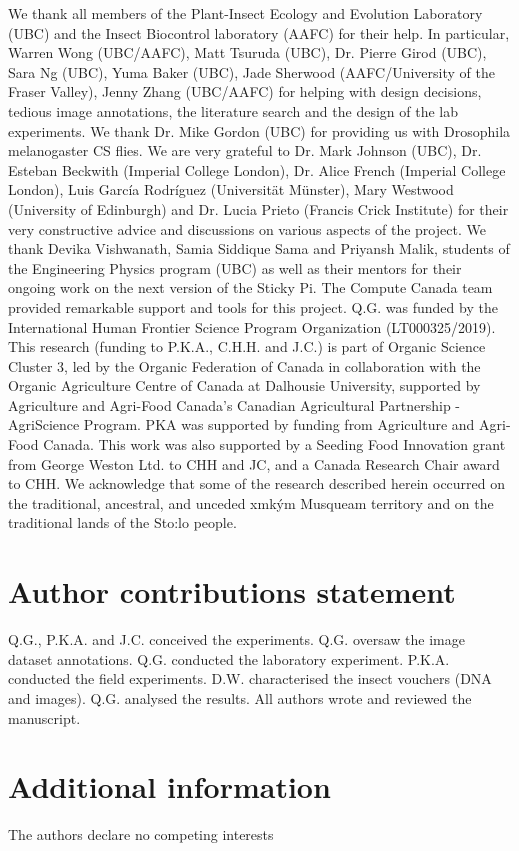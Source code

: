 \documentclass[12pt]{article}
\newcommand{\musqueam}{x\super{w}m\textschwa{}\texttheta{}k\super{w}\textschwa{}\'{y}\textschwa{}m}
\begin{document}
\begin{linenumbers}
{			We thank all members of the Plant-Insect Ecology and Evolution Laboratory (UBC) and the Insect Biocontrol laboratory (AAFC) for their help. In particular, Warren Wong (UBC/AAFC), Matt Tsuruda (UBC), Dr. Pierre Girod (UBC), Sara Ng (UBC), Yuma Baker (UBC), Jade Sherwood (AAFC/University of the Fraser Valley), Jenny Zhang (UBC/AAFC) for helping with design decisions, tedious image annotations, the literature search and the design of the lab experiments. We thank Dr. Mike Gordon (UBC) for providing us with Drosophila melanogaster CS flies. We are very grateful to Dr. Mark Johnson (UBC), Dr. Esteban Beckwith (Imperial College London), Dr. Alice French (Imperial College London), Luis García Rodríguez (Universität Münster), Mary Westwood (University of Edinburgh) and Dr. Lucia Prieto (Francis Crick Institute) for their very constructive advice and discussions on various aspects of the project. We thank Devika Vishwanath, Samia Siddique Sama and Priyansh Malik, students of the Engineering Physics program (UBC) as well as their mentors for their ongoing work on the next version of the Sticky Pi. The Compute Canada team provided remarkable support and tools for this project. Q.G. was funded by the International Human Frontier Science Program Organization (LT000325/2019). This research (funding to P.K.A., C.H.H. and J.C.) is part of Organic Science Cluster 3, led by the Organic Federation of Canada in collaboration with the Organic Agriculture Centre of Canada at Dalhousie University, supported by Agriculture and Agri-Food Canada’s Canadian Agricultural Partnership - AgriScience Program. PKA was supported by funding from Agriculture and Agri-Food Canada. This work was also supported by a Seeding Food Innovation grant from George Weston Ltd. to CHH and JC, and a Canada Research Chair award to CHH. We acknowledge that some of the research described herein occurred on the traditional, ancestral, and unceded \musqueam{} Musqueam territory and on the traditional lands of the Sto:lo people.}

		\section*{Author contributions statement}
		Q.G., P.K.A. and J.C. conceived the experiments.
		Q.G. oversaw the image dataset annotations.
		Q.G. conducted the laboratory experiment. 
		P.K.A. conducted the field experiments.
		D.W. characterised the insect vouchers (DNA and images).
		Q.G. analysed the results.
		All authors wrote and reviewed the manuscript. 

		\section*{Additional information}
		The authors declare no competing interests

		
	\end{linenumbers}
	{
		
		
	}
\end{document}
